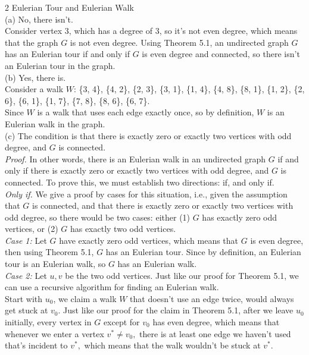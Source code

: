 \documentclass{article}
\begin{document}
{\Large 2 Eulerian Tour and Eulerian Walk} \\[.5cm]
(a) No, there isn't. \\[.3cm]
\indent Consider vertex 3, which has a degree of 3, so it's not even degree, which means that the graph $G$ is not even degree. Using Theorem 5.1, an undirected graph $G$ has an Eulerian tour if and only if $G$ is even degree and connected, so there isn't an Eulerian tour in the graph. \\[.5cm]
(b) Yes, there is. \\[.3cm]
\indent Consider a walk $W$: \{3, 4\}, \{4, 2\}, \{2, 3\}, \{3, 1\}, \{1, 4\}, \{4, 8\}, \{8, 1\}, \{1, 2\}, \{2, 6\}, \{6, 1\}, \{1, 7\}, \{7, 8\}, \{8, 6\}, \{6, 7\}. \\[.3cm]
\indent Since $W$ is a walk that uses each edge exactly once, so by definition, $W$ is an Eulerian walk in the graph. \\[.5cm]
(c) The condition is that there is exactly zero or exactly two vertices with odd degree, and $G$ is connected.\\[.5cm]
\textit{Proof.} In other words, there is an Eulerian walk in an undirected graph $G$ if and only if there is exactly zero or exactly two vertices with odd degree, and $G$ is connected. To prove this, we must establish two directions: if, and only if.\\[.3cm]
\textit{Only if.} We give a proof by cases for this situation, i.e., given the assumption that $G$ is connected, and that there is exactly zero or exactly two vertices with odd degree, so there would be two cases: either (1) $G$ has exactly zero odd vertices, or (2) $G$ has exactly two odd vertices. \\[.3cm]
\indent\textit{Case 1:} Let $G$ have exactly zero odd vertices, which means that $G$ is even degree, then using Theorem 5.1, $G$ has an Eulerian tour. Since by definition, an Eulerian tour is an Eulerian walk, so $G$ has an Eulerian walk. \\[.3cm]
\indent\textit{Case 2:} Let $u, v$ be the two odd vertices. Just like our proof for Theorem 5.1, we can use a recursive algorithm for finding an Eulerian walk. \\[.1cm]
\indent Start with $u_0$, we claim a walk $W$ that doesn't use an edge twice, would always get stuck at $v_0$. Just like our proof for the claim in Theorem 5.1, after we leave $u_0$ initially, every vertex in $G$ except for $v_0$ has even degree, which means that whenever we enter a vertex $v^*\neq v_0,$ there is at least one edge we haven't used that's incident to $v^*,$ which means that the walk wouldn't be stuck at $v^*.$
\end{document}
